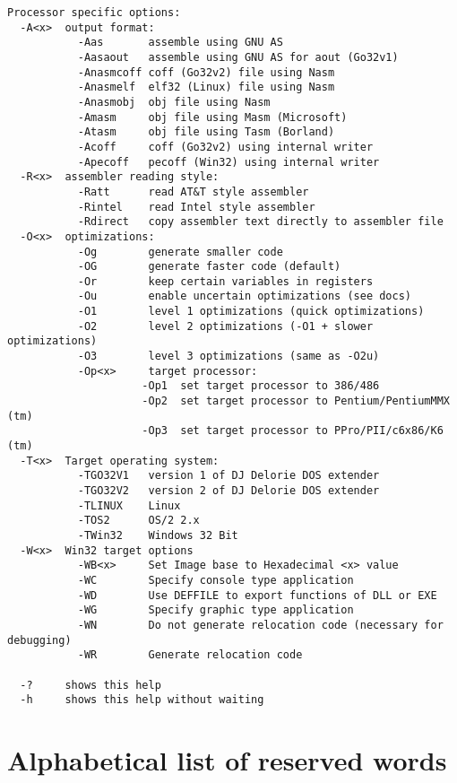 \documentclass{book}
\begin{document}
\begin{verbatim}
Processor specific options:
  -A<x>  output format:
           -Aas       assemble using GNU AS
           -Aasaout   assemble using GNU AS for aout (Go32v1)
           -Anasmcoff coff (Go32v2) file using Nasm
           -Anasmelf  elf32 (Linux) file using Nasm
           -Anasmobj  obj file using Nasm
           -Amasm     obj file using Masm (Microsoft)
           -Atasm     obj file using Tasm (Borland)
           -Acoff     coff (Go32v2) using internal writer
           -Apecoff   pecoff (Win32) using internal writer
  -R<x>  assembler reading style:
           -Ratt      read AT&T style assembler
           -Rintel    read Intel style assembler
           -Rdirect   copy assembler text directly to assembler file
  -O<x>  optimizations:
           -Og        generate smaller code
           -OG        generate faster code (default)
           -Or        keep certain variables in registers
           -Ou        enable uncertain optimizations (see docs)
           -O1        level 1 optimizations (quick optimizations)
           -O2        level 2 optimizations (-O1 + slower optimizations)
           -O3        level 3 optimizations (same as -O2u)
           -Op<x>     target processor:
                     -Op1  set target processor to 386/486
                     -Op2  set target processor to Pentium/PentiumMMX (tm)
                     -Op3  set target processor to PPro/PII/c6x86/K6 (tm)
  -T<x>  Target operating system:
           -TGO32V1   version 1 of DJ Delorie DOS extender
           -TGO32V2   version 2 of DJ Delorie DOS extender
           -TLINUX    Linux
           -TOS2      OS/2 2.x
           -TWin32    Windows 32 Bit
  -W<x>  Win32 target options
           -WB<x>     Set Image base to Hexadecimal <x> value
           -WC        Specify console type application
           -WD        Use DEFFILE to export functions of DLL or EXE
           -WG        Specify graphic type application
           -WN        Do not generate relocation code (necessary for debugging)
           -WR        Generate relocation code

  -?     shows this help
  -h     shows this help without waiting
\end{verbatim}



\chapter{Alphabetical list of reserved words}
\label{ch:reserved}
\begin{multicols}{3}

\end{multicols}
\end{document}
